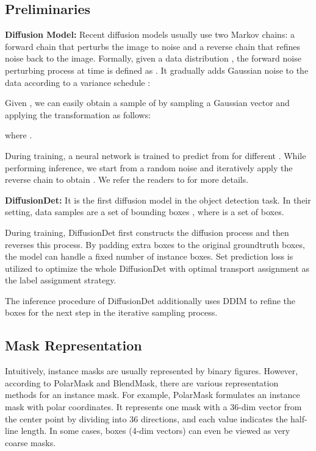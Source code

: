 \documentclass{article}
\begin{document}
\subsection{Preliminaries}


\noindent \textbf{Diffusion Model:} Recent diffusion models usually use two Markov chains: a forward chain that perturbs the image to noise and a reverse chain that refines noise back to the image. Formally, given a data distribution , the forward noise perturbing process at time  is defined as . It gradually adds Gaussian noise to the data according to a variance schedule :

Given , we can easily obtain a sample of  by sampling a Gaussian vector  and applying the transformation as follows:

where .

During training, a neural network is trained to predict  from  for different . While performing inference, we start from a random noise  and iteratively apply the reverse chain to obtain . We refer the readers to \cite{yang2022diffusion} for more details.


\noindent \textbf{DiffusionDet:} It is the first diffusion model in the object detection task. In their setting, data samples are a set of bounding boxes , where  is a set of  boxes. 

During training, DiffusionDet first constructs the diffusion process and then reverses this process. By padding extra boxes to the original groundtruth boxes, the model can handle a fixed number of instance boxes. Set prediction loss\cite{DETR} is utilized to optimize the whole DiffusionDet with optimal transport assignment\cite{DBLP:journals/corr/abs-2103-14259} as the label assignment strategy.

The inference procedure of DiffusionDet additionally uses DDIM\cite{DBLP:journals/corr/abs-2010-02502} to refine the boxes for the next step in the iterative sampling process. 

\subsection{Mask Representation}

Intuitively, instance masks are usually represented by binary figures. However, according to PolarMask\cite{PolarMask} and BlendMask\cite{BlendMask}, there are various representation methods for an instance mask. For example, PolarMask formulates an instance mask with polar coordinates. It represents one mask with a 36-dim vector from the center point by dividing  into 36 directions, and each value indicates the half-line length. In some cases, boxes (4-dim vectors) can even be viewed as very coarse masks. 
\end{document}
